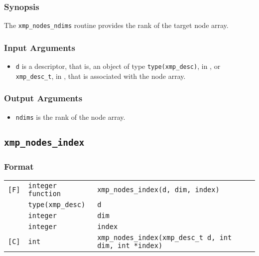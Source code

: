 \subsubsection*{Synopsis}

The {\tt xmp\_nodes\_ndims} routine provides the rank of the target node array.

\subsubsection*{Input Arguments}
\begin{itemize}
 \item {\tt d} is a descriptor, that is, an object of type 
       {\tt type(xmp\_desc)}, in {\XMPF}, or {\tt xmp\_desc\_t},
       in {\XMPC}, that is associated with the node array.
\end{itemize}

\subsubsection*{Output Arguments}
\begin{itemize}
 \item {\tt ndims} is the rank of the node array.
\end{itemize}


\subsection{\tt xmp\_nodes\_index}

\subsubsection*{Format}

\begin{tabular}{lll}

\verb![F]!& {\tt integer function}& {\tt xmp\_nodes\_index(d, dim, index)}\\
          & {\tt type(xmp\_desc)} & {\tt d}\\
          & {\tt integer} & {\tt dim}\\
          & {\tt integer} & {\tt index}\\

\verb![C]!&  {\tt int}& {\tt xmp\_nodes\_index(xmp\_desc\_t d, int dim, int *index)}\\

\end{tabular}

